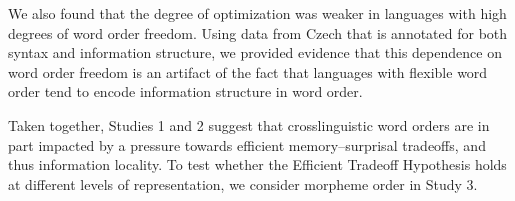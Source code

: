 We also found that the degree of optimization was weaker in languages with high degrees of word order freedom.
Using data from Czech that is annotated for both syntax and information structure, we provided evidence that this dependence on word order freedom is an artifact of the fact that languages with flexible word order tend to encode information structure in word order.

Taken together, Studies 1 and 2 suggest that crosslinguistic word orders are in part impacted by a pressure towards efficient memory--surprisal tradeoffs, and thus information locality.
To test whether the Efficient Tradeoff Hypothesis holds at different levels of representation, we consider morpheme order in Study 3.











%
%
%
%



